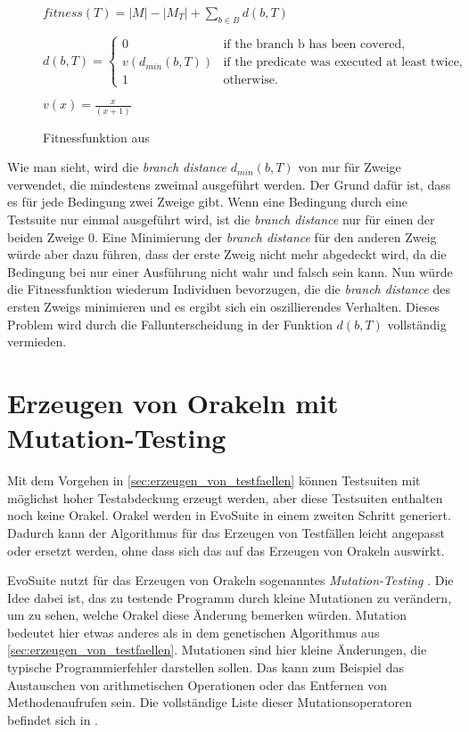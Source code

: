 \documentclass[a4paper,11pt]{article}
\begin{document}
\begin{figure}[h]
	$fitness(T) = |M| - |M_T| + \sum\limits_{b \in B} d(b, T)$

	$d(b, T) = \begin{cases}
	0 & \text{if the branch b has been covered,}\\
	v(d_{min}(b, T)) & \text{if the predicate was executed at least twice,}\\
	1 & \text{otherwise.}
	\end{cases}$

	$v(x) = \frac{x}{(x+1)}$
	\caption{Fitnessfunktion aus \cite{TSE12_EvoSuite}}
	\label{fig:fitnessfunktion}
\end{figure}

Wie man sieht, wird die \textit{branch distance} $d_{min}(b, T)$ von \citet{10.1109/32.57624} nur für Zweige verwendet, die mindestens zweimal ausgeführt werden.
Der Grund dafür ist, dass es für jede Bedingung zwei Zweige gibt.
Wenn eine Bedingung durch eine Testsuite nur einmal ausgeführt wird, ist die \textit{branch distance} nur für einen der beiden Zweige 0.
Eine Minimierung der \textit{branch distance} für den anderen Zweig würde aber dazu führen, dass der erste Zweig nicht mehr abgedeckt wird, da die Bedingung bei nur einer Ausführung nicht wahr und falsch sein kann.
Nun würde die Fitnessfunktion wiederum Individuen bevorzugen, die die \textit{branch distance} des ersten Zweigs minimieren und es ergibt sich ein oszillierendes Verhalten.
Dieses Problem wird durch die Fallunterscheidung in der Funktion $d(b, T)$ vollständig vermieden.

\section{Erzeugen von Orakeln mit Mutation-Testing}
\label{sec:erzeugen_von_orakeln}

Mit dem Vorgehen in \cref{sec:erzeugen_von_testfaellen} können Testsuiten mit möglichst hoher Testabdeckung erzeugt werden, aber diese Testsuiten enthalten noch keine Orakel.
Orakel werden in EvoSuite in einem zweiten Schritt generiert.
Dadurch kann der Algorithmus für das Erzeugen von Testfällen leicht angepasst oder ersetzt werden, ohne dass sich das auf das Erzeugen von Orakeln auswirkt.

EvoSuite nutzt für das Erzeugen von Orakeln sogenanntes \textit{Mutation-Testing} \cite{TSE12_Mutation, emse14_mutation}.
Die Idee dabei ist, das zu testende Programm durch kleine Mutationen zu verändern, um zu sehen, welche Orakel diese Änderung bemerken würden.
Mutation bedeutet hier etwas anderes als in dem genetischen Algorithmus aus \cref{sec:erzeugen_von_testfaellen}.
Mutationen sind hier kleine Änderungen, die typische Programmierfehler darstellen sollen.
Das kann zum Beispiel das Austauschen von arithmetischen Operationen oder das Entfernen von Methodenaufrufen sein.
Die vollständige Liste dieser Mutationsoperatoren befindet sich in \cite{emse14_mutation}.
\end{document}
